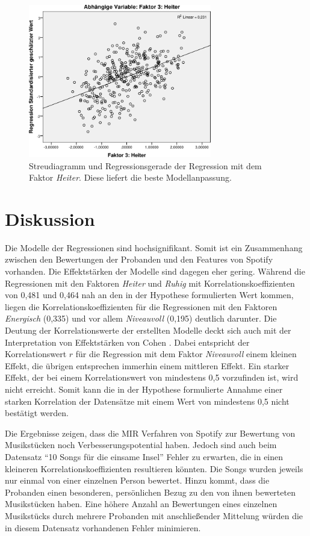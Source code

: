 \begin{figure}[hbt]
    \begin{center}
        \includegraphics[width=8cm]{images/StreudiagrammFak3.pdf}
    \end{center}
    \caption{Streudiagramm und Regressionsgerade der Regression mit dem Faktor \textit{Heiter}. Diese liefert die beste Modellanpassung.}
    \label{fig:Faktor3}
\end{figure}

\section*{Diskussion}
\label{sec:Diskussion}


Die Modelle der Regressionen sind hochsignifikant.
Somit ist ein Zusammenhang zwischen den Bewertungen der Probanden und den Features von Spotify vorhanden.
Die Effektstärken der Modelle sind dagegen eher gering. 
Während die Regressionen mit den Faktoren \textit{Heiter} und \textit{Ruhig} mit Korrelationskoeffizienten von 0,481 und 0,464 nah an den in der Hypothese formulierten Wert kommen, liegen die Korrelationskoeffizienten für die Regressionen mit den Faktoren  \textit{Energisch} (0,335) und vor allem \textit{Niveauvoll} (0,195) deutlich darunter.
Die Deutung der Korrelationswerte der erstellten Modelle deckt sich auch mit der Interpretation von Effektstärken von Cohen \cite{cohen1988}.
Dabei entspricht der Korrelationswert $r$ für die Regression mit dem Faktor \textit{Niveauvoll} einem kleinen Effekt, die übrigen entsprechen immerhin einem mittleren Effekt.
Ein starker Effekt, der bei einem Korrelationswert von mindestens 0,5 vorzufinden ist, wird nicht erreicht.
Somit kann die in der Hypothese formulierte Annahme einer starken Korrelation der Datensätze mit einem Wert von mindestens 0,5 nicht bestätigt werden. 

Die Ergebnisse zeigen, dass die MIR Verfahren von Spotify zur Bewertung von Musikstücken noch Verbesserungspotential haben.
Jedoch sind auch beim Datensatz "`10 Songs für die einsame Insel"' Fehler zu erwarten, die in einen kleineren Korrelationskoeffizienten resultieren könnten.
Die Songs wurden jeweils nur einmal von einer einzelnen Person bewertet.
Hinzu kommt, dass die Probanden einen besonderen, persönlichen Bezug zu den von ihnen bewerteten Musikstücken haben.
Eine höhere Anzahl an Bewertungen eines einzelnen Musikstücks durch mehrere Probanden mit anschließender Mittelung würden die in diesem Datensatz vorhandenen Fehler minimieren.

